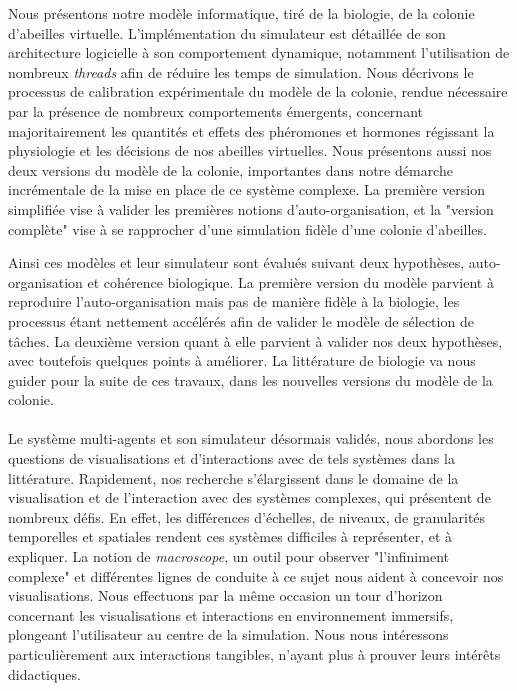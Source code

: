 Nous présentons notre modèle informatique, tiré de la biologie, de la colonie d'abeilles virtuelle. L'implémentation du simulateur est détaillée de son architecture logicielle à son comportement dynamique, notamment l'utilisation de nombreux \textit{threads} afin de réduire les temps de simulation. Nous décrivons le processus de calibration expérimentale du modèle de la colonie, rendue nécessaire par la présence de nombreux comportements émergents, concernant majoritairement les quantités et effets des phéromones et hormones régissant la physiologie et les décisions de nos abeilles virtuelles. Nous présentons aussi nos deux versions du modèle de la colonie, importantes dans notre démarche incrémentale de la mise en place de ce système complexe. La première version simplifiée vise à valider les premières notions d'auto-organisation, et la "version complète" vise à se rapprocher d'une simulation fidèle d'une colonie d'abeilles.

Ainsi ces modèles et leur simulateur sont évalués suivant deux hypothèses, auto-organisation et cohérence biologique. La première version du modèle parvient à reproduire l'auto-organisation mais pas de manière fidèle à la biologie, les processus étant nettement accélérés afin de valider le modèle de sélection de tâches. La deuxième version quant à elle parvient à valider nos deux hypothèses, avec toutefois quelques points à améliorer. La littérature de biologie va nous guider pour la suite de ces travaux, dans les nouvelles versions du modèle de la colonie.

\paragraph{}

Le système multi-agents et son simulateur désormais validés, nous abordons les questions de visualisations et d'interactions avec de tels systèmes dans la littérature. Rapidement, nos recherche s'élargissent dans le domaine de la visualisation et de l'interaction avec des systèmes complexes, qui présentent de nombreux défis. En effet, les différences d'échelles, de niveaux, de granularités temporelles et spatiales rendent ces systèmes difficiles à représenter, et à expliquer. La notion de \textit{macroscope}, un outil pour observer "l'infiniment complexe" et différentes lignes de conduite à ce sujet nous aident à concevoir nos visualisations. Nous effectuons par la même occasion un tour d'horizon concernant les visualisations et interactions en environnement immersifs, plongeant l'utilisateur au centre de la simulation. Nous nous intéressons particulièrement aux interactions tangibles, n'ayant plus à prouver leurs intérêts didactiques.


